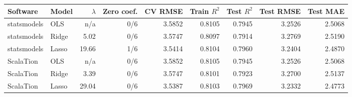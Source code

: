 \begin{tabular}{@{}llrrrrrrr@{}}
\toprule
Software & Model & $\lambda$ & Zero coef. & CV RMSE & Train $R^2$ & Test $R^2$ & Test RMSE & Test MAE \\
\midrule
statsmodels & OLS & n/a & 0/6 & 3.5852 & 0.8105 & 0.7945 & 3.2526 & 2.5068 \\
statsmodels & Ridge & 5.02 & 0/6 & 3.5747 & 0.8097 & 0.7914 & 3.2769 & 2.5190 \\
statsmodels & Lasso & 19.66 & 1/6 & 3.5414 & 0.8104 & 0.7960 & 3.2404 & 2.4870 \\
\midrule
ScalaTion & OLS & n/a & 0/6 & 3.5852 & 0.8105 & 0.7945 & 3.2526 & 2.5068 \\
ScalaTion & Ridge & 3.39 & 0/6 & 3.5747 & 0.8101 & 0.7923 & 3.2700 & 2.5137 \\
ScalaTion & Lasso & 29.04 & 0/6 & 3.5387 & 0.8103 & 0.7969 & 3.2332 & 2.4773 \\
\bottomrule
\end{tabular}